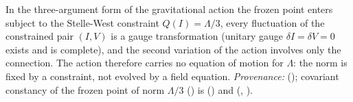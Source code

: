 In the three-argument form of the gravitational action the frozen point enters subject to the Stelle-West constraint $Q(I) = \Lambda/3$, every fluctuation of the constrained pair $(I, V)$ is a gauge transformation (unitary gauge $\delta I = \delta V = 0$ exists and is complete), and the second variation of the action involves only the connection. The action therefore carries no equation of motion for $\Lambda$: the norm is fixed by a constraint, not evolved by a field equation. \emph{Provenance:} \cite[Prop.~5.4]{ButlerT10} (); covariant constancy of the frozen point of norm $\Lambda/3$ () is \cite[Prop.~4.2(i)]{ButlerT10} () and \cite[Thms.~4.5, 4.7]{ButlerT6} (, ).
